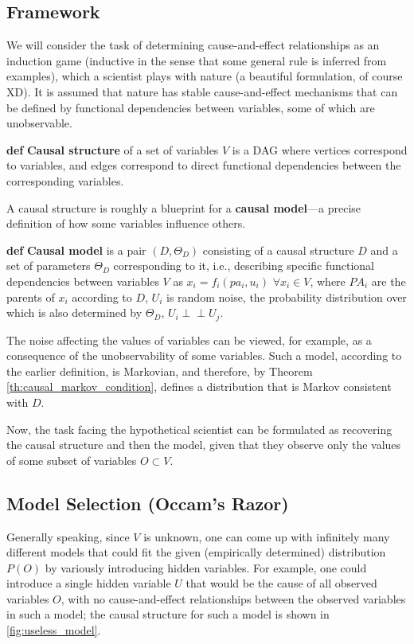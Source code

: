 \documentclass[fleqn]{article}
\newcommand{\independent}{\perp \!\!\! \perp}
\def\define#1{\textbf{def} \textbf{#1}}
\numberwithin{equation}{section}
\numberwithin{theorem}{section}
\numberwithin{figure}{section}
\numberwithin{lemma}{section}
\numberwithin{corollary}{section}
\begin{document}
\subsection*{Framework}

We will consider the task of determining cause-and-effect relationships as an induction game (inductive in the sense that some general rule is inferred from examples), which a scientist plays with nature (a beautiful formulation, of course XD). It is assumed that nature has stable cause-and-effect mechanisms that can be defined by functional dependencies between variables, some of which are unobservable.

\define{Causal structure} of a set of variables $V$ is a DAG where vertices correspond to variables, and edges correspond to direct functional dependencies between the corresponding variables.

A causal structure is roughly a blueprint for a \textbf{causal model}—a precise definition of how some variables influence others.

\define{Causal model} is a pair $(D, \Theta_D)$ consisting of a causal structure $D$ and a set of parameters $\Theta_D$ corresponding to it, i.e., describing specific functional dependencies between variables $V$ as $x_i = f_i(pa_i, u_i)$ $\forall x_i \in V$, where $PA_i$ are the parents of $x_i$ according to $D$, $U_i$ is random noise, the probability distribution over which is also determined by $\Theta_D$, $U_i \independent U_j$.

The noise affecting the values of variables can be viewed, for example, as a consequence of the unobservability of some variables. Such a model, according to the earlier definition, is Markovian, and therefore, by Theorem \ref{th:causal_markov_condition}, defines a distribution that is Markov consistent with $D$.

Now, the task facing the hypothetical scientist can be formulated as recovering the causal structure and then the model, given that they observe only the values of some subset of variables $O \subset V$.

\subsection*{Model Selection (Occam's Razor)}

Generally speaking, since $V$ is unknown, one can come up with infinitely many different models that could fit the given (empirically determined) distribution $P(O)$ by variously introducing hidden variables. For example, one could introduce a single hidden variable $U$ that would be the cause of all observed variables $O$, with no cause-and-effect relationships between the observed variables in such a model; the causal structure for such a model is shown in \ref{fig:useless_model}.
\end{document}
